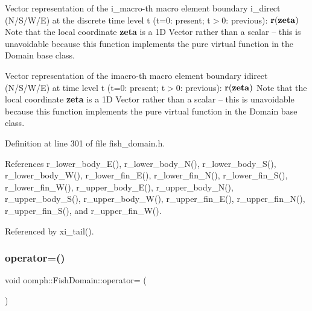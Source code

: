 Vector representation of the i\+\_\+macro-\/th macro element boundary i\+\_\+direct (N/\+S/\+W/E) at the discrete time level t (t=0\+: present; t$>$0\+: previous)\+: $ {\bf r}({\bf zeta}) $ Note that the local coordinate {\bfseries zeta} is a 1D Vector rather than a scalar -- this is unavoidable because this function implements the pure virtual function in the Domain base class. 

Vector representation of the imacro-\/th macro element boundary idirect (N/\+S/\+W/E) at time level t (t=0\+: present; t$>$0\+: previous)\+: $ {\bf r}({\bf zeta}) $ Note that the local coordinate {\bfseries zeta} is a 1D Vector rather than a scalar -- this is unavoidable because this function implements the pure virtual function in the Domain base class. 

Definition at line 301 of file fish\+\_\+domain.\+h.



References r\+\_\+lower\+\_\+body\+\_\+\+E(), r\+\_\+lower\+\_\+body\+\_\+\+N(), r\+\_\+lower\+\_\+body\+\_\+\+S(), r\+\_\+lower\+\_\+body\+\_\+\+W(), r\+\_\+lower\+\_\+fin\+\_\+\+E(), r\+\_\+lower\+\_\+fin\+\_\+\+N(), r\+\_\+lower\+\_\+fin\+\_\+\+S(), r\+\_\+lower\+\_\+fin\+\_\+\+W(), r\+\_\+upper\+\_\+body\+\_\+\+E(), r\+\_\+upper\+\_\+body\+\_\+\+N(), r\+\_\+upper\+\_\+body\+\_\+\+S(), r\+\_\+upper\+\_\+body\+\_\+\+W(), r\+\_\+upper\+\_\+fin\+\_\+\+E(), r\+\_\+upper\+\_\+fin\+\_\+\+N(), r\+\_\+upper\+\_\+fin\+\_\+\+S(), and r\+\_\+upper\+\_\+fin\+\_\+\+W().



Referenced by xi\+\_\+tail().

\mbox{\label{classoomph_1_1FishDomain_a87fdf6ae5c6d51e2dcd1aecb494ddaee}} 
\subsubsection{\texorpdfstring{operator=()}{operator=()}}
{\footnotesize\ttfamily void oomph\+::\+Fish\+Domain\+::operator= (\begin{DoxyParamCaption}\item[{const \hyperlink{classoomph_1_1FishDomain}{Fish\+Domain} \&}]{ }\end{DoxyParamCaption})\hspace{0.3cm}{\ttfamily [inline]}}



